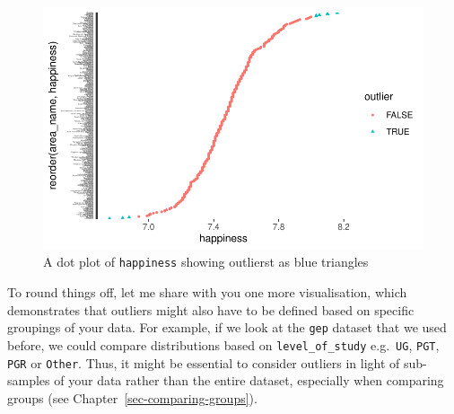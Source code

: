 \documentclass[
  letterpaper,
]{krantz}
\begin{document}
\begin{figure}[H]

{\centering \includegraphics{09_sources_of_bias_files/figure-latex/plot-outliers-different-format-1.pdf}

}

\caption{A dot plot of \texttt{happiness} showing outlierst as blue
triangles}

\end{figure}%

To round things off, let me share with you one more visualisation, which
demonstrates that outliers might also have to be defined based on
specific groupings of your data. For example, if we look at the
\texttt{gep} dataset that we used before, we could compare distributions
based on \texttt{level\_of\_study} e.g.~\texttt{UG}, \texttt{PGT},
\texttt{PGR} or \texttt{Other}. Thus, it might be essential to consider
outliers in light of sub-samples of your data rather than the entire
dataset, especially when comparing groups (see
Chapter~\ref{sec-comparing-groups}).
\end{document}
